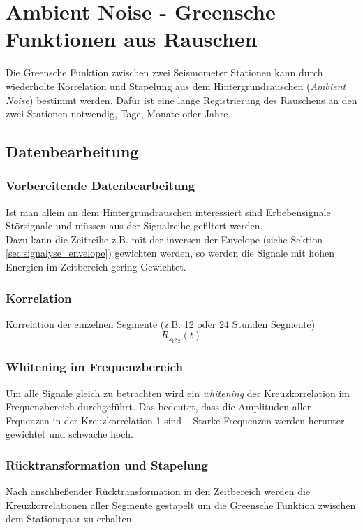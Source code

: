 \section{Ambient Noise - Greensche Funktionen aus Rauschen}
Die Greensche Funktion zwischen zwei Seismometer Stationen kann durch wiederholte Korrelation und Stapelung aus dem Hintergrundrauschen (\textit{Ambient Noise}) bestimmt werden. Dafür ist eine lange Registrierung des Rauschens an den zwei Stationen notwendig, Tage, Monate oder Jahre.

\subsection{Datenbearbeitung}
\subsubsection*{Vorbereitende Datenbearbeitung}
Ist man allein an dem Hintergrundrauschen interessiert sind Erbebensignale Störsignale und müssen aus der Signalreihe gefiltert werden.\\
Dazu kann die Zeitreihe z.B. mit der inversen der Envelope (siehe Sektion \ref{sec:signalyse_envelope}) gewichten werden, so werden die Signale mit hohen Energien im Zeitbereich gering Gewichtet.

\subsubsection*{Korrelation}
Korrelation der einzelnen Segmente (z.B. 12 oder 24 Stunden Segmente)
\[
R_{s_1 s_2}(t)
\]

\subsubsection*{Whitening im Frequenzbereich}
Um alle Signale gleich zu betrachten wird ein \textit{whitening} der Kreuzkorrelation im Frequenzbereich durchgeführt. Das bedeutet, dass die Amplituden aller Frquenzen in der Kreuzkorrelation 1 sind -- Starke Frequenzen werden herunter gewichtet und schwache hoch.

\subsubsection*{Rücktransformation und Stapelung}
Nach anschließender Rücktransformation in den Zeitbereich werden die Kreuzkorrelationen aller Segmente gestapelt um die Greensche Funktion zwischen dem Stationspaar zu erhalten.